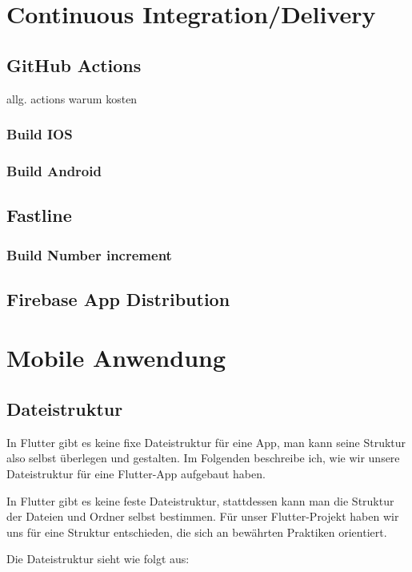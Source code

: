 \section{Continuous Integration/Delivery}
\subsection{GitHub Actions}

allg. actions warum kosten
\subsubsection{Build IOS}

\subsubsection{Build Android}

\subsection{Fastline}
\subsubsection{Build Number increment}
\subsection{Firebase App Distribution}

\section{Mobile Anwendung}
\subsection{Dateistruktur}
In Flutter gibt es keine fixe Dateistruktur für eine App,
man kann seine Struktur also selbst überlegen und gestalten.
Im Folgenden beschreibe ich, wie wir unsere Dateistruktur
für eine Flutter-App aufgebaut haben.

In Flutter gibt es keine feste Dateistruktur, stattdessen kann man die Struktur der Dateien und Ordner selbst bestimmen. Für unser Flutter-Projekt haben wir uns für eine Struktur entschieden, die sich an bewährten Praktiken orientiert.

Die Dateistruktur sieht wie folgt aus:

